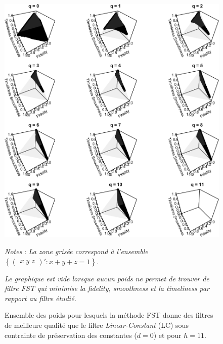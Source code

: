 \documentclass[
  11pt,
  french,
  a4paper]{article}
\newcommand\1{\mathds{1}}
\begin{document}
\begin{figure}[H]

{\centering \includegraphics{img/bookdown/pdf/lc11d0-1} 

}

\caption[Ensemble des poids pour lesquels la méthode FST donne des filtres de meilleure qualité que le filtre \emph{Linear-Constant} (LC) sous contrainte de préservation des constantes (\(d=0\)) et pour \(h=11\)]{Ensemble des poids pour lesquels la méthode FST donne des filtres de meilleure qualité que le filtre \emph{Linear-Constant} (LC) sous contrainte de préservation des constantes (\(d=0\)) et pour \(h=11\).}\label{fig:lc11d0}

\footnotesize


\emph{Notes} : \emph{La zone grisée correspond à l'ensemble \(\left\{\begin{pmatrix}x \; y \; z \end{pmatrix}' : x+y+z=1\right\}\).}

\emph{Le graphique est vide lorsque aucun poids ne permet de trouver de filtre FST qui minimise la \emph{fidelity}, \emph{smoothness} et la \emph{timeliness} par rapport au filtre étudié.}
\normalsize\end{figure}
\end{document}
